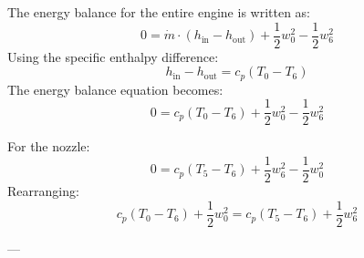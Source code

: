 The energy balance for the entire engine is written as:  
\[
0 = \dot{m} \cdot (h_{\text{in}} - h_{\text{out}}) + \frac{1}{2} w_0^2 - \frac{1}{2} w_6^2
\]  
Using the specific enthalpy difference:  
\[
h_{\text{in}} - h_{\text{out}} = c_p (T_0 - T_6)
\]  
The energy balance equation becomes:  
\[
0 = c_p (T_0 - T_6) + \frac{1}{2} w_0^2 - \frac{1}{2} w_6^2
\]  

For the nozzle:  
\[
0 = c_p (T_5 - T_6) + \frac{1}{2} w_6^2 - \frac{1}{2} w_0^2
\]  
Rearranging:  
\[
c_p (T_0 - T_6) + \frac{1}{2} w_0^2 = c_p (T_5 - T_6) + \frac{1}{2} w_6^2
\]  

---